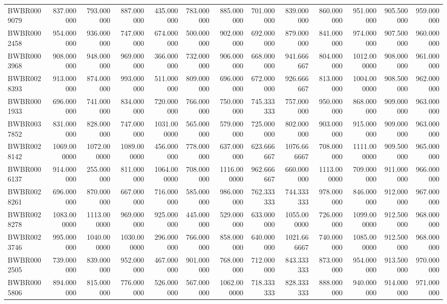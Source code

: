 \begin{longtable}{lrrrrrrrrrrrr}
BWBR0009079 & 837.000000 & 793.000000 & 887.000000 & 435.000000 & 783.000000 & 885.000000 & 701.000000 & 839.000000 & 860.000000 & 951.000000 & 905.500000 & 959.000000 \\
BWBR0002458 & 954.000000 & 936.000000 & 747.000000 & 674.000000 & 500.000000 & 902.000000 & 692.000000 & 879.000000 & 841.000000 & 974.000000 & 907.500000 & 960.000000 \\
BWBR0003968 & 908.000000 & 948.000000 & 969.000000 & 366.000000 & 732.000000 & 906.000000 & 668.000000 & 941.666667 & 804.000000 & 1012.000000 & 908.000000 & 961.000000 \\
BWBR0028393 & 913.000000 & 874.000000 & 993.000000 & 511.000000 & 809.000000 & 696.000000 & 672.000000 & 926.666667 & 813.000000 & 1004.000000 & 908.500000 & 962.000000 \\
BWBR0001933 & 696.000000 & 741.000000 & 834.000000 & 720.000000 & 766.000000 & 750.000000 & 745.333333 & 757.000000 & 950.000000 & 868.000000 & 909.000000 & 963.000000 \\
BWBR0037852 & 831.000000 & 828.000000 & 747.000000 & 1031.000000 & 565.000000 & 579.000000 & 725.000000 & 802.000000 & 903.000000 & 915.000000 & 909.000000 & 963.000000 \\
BWBR0028142 & 1069.000000 & 1072.000000 & 1089.000000 & 456.000000 & 778.000000 & 637.000000 & 623.666667 & 1076.666667 & 708.000000 & 1111.000000 & 909.500000 & 965.000000 \\
BWBR0006137 & 914.000000 & 255.000000 & 811.000000 & 1064.000000 & 708.000000 & 1116.000000 & 962.666667 & 660.000000 & 1113.000000 & 709.000000 & 911.000000 & 966.000000 \\
BWBR0028261 & 696.000000 & 870.000000 & 667.000000 & 716.000000 & 585.000000 & 986.000000 & 762.333333 & 744.333333 & 978.000000 & 846.000000 & 912.000000 & 967.000000 \\
BWBR0028278 & 1083.000000 & 1113.000000 & 969.000000 & 925.000000 & 445.000000 & 529.000000 & 633.000000 & 1055.000000 & 726.000000 & 1099.000000 & 912.500000 & 968.000000 \\
BWBR0023746 & 995.000000 & 1040.000000 & 1030.000000 & 296.000000 & 766.000000 & 858.000000 & 640.000000 & 1021.666667 & 740.000000 & 1085.000000 & 912.500000 & 968.000000 \\
BWBR0002505 & 739.000000 & 839.000000 & 952.000000 & 467.000000 & 901.000000 & 768.000000 & 712.000000 & 843.333333 & 873.000000 & 954.000000 & 913.500000 & 970.000000 \\
BWBR0005806 & 894.000000 & 815.000000 & 776.000000 & 526.000000 & 567.000000 & 1062.000000 & 718.333333 & 828.333333 & 888.000000 & 940.000000 & 914.000000 & 971.000000 \\

\end{longtable}
